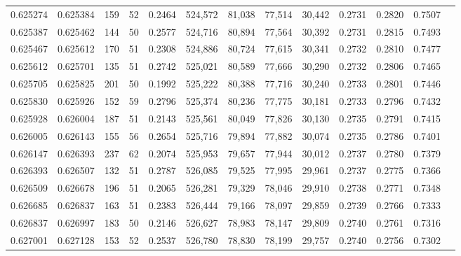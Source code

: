 \begin{tabular}{rrrrrrrrrrrrr}
0.625274 & 0.625384 &   159 &  52 &                                     0.2464 & 524,572 &  81,038 &  77,514 &  30,442 & 0.2731 & 0.2820 & 0.7507 \\
0.625387 & 0.625462 &   144 &  50 &                                     0.2577 & 524,716 &  80,894 &  77,564 &  30,392 & 0.2731 & 0.2815 & 0.7493 \\
0.625467 & 0.625612 &   170 &  51 &                                     0.2308 & 524,886 &  80,724 &  77,615 &  30,341 & 0.2732 & 0.2810 & 0.7477 \\
0.625612 & 0.625701 &   135 &  51 &                                     0.2742 & 525,021 &  80,589 &  77,666 &  30,290 & 0.2732 & 0.2806 & 0.7465 \\
0.625705 & 0.625825 &   201 &  50 &                                     0.1992 & 525,222 &  80,388 &  77,716 &  30,240 & 0.2733 & 0.2801 & 0.7446 \\
0.625830 & 0.625926 &   152 &  59 &                                     0.2796 & 525,374 &  80,236 &  77,775 &  30,181 & 0.2733 & 0.2796 & 0.7432 \\
0.625928 & 0.626004 &   187 &  51 &                                     0.2143 & 525,561 &  80,049 &  77,826 &  30,130 & 0.2735 & 0.2791 & 0.7415 \\
0.626005 & 0.626143 &   155 &  56 &                                     0.2654 & 525,716 &  79,894 &  77,882 &  30,074 & 0.2735 & 0.2786 & 0.7401 \\
0.626147 & 0.626393 &   237 &  62 &                                     0.2074 & 525,953 &  79,657 &  77,944 &  30,012 & 0.2737 & 0.2780 & 0.7379 \\
0.626393 & 0.626507 &   132 &  51 &                                     0.2787 & 526,085 &  79,525 &  77,995 &  29,961 & 0.2737 & 0.2775 & 0.7366 \\
0.626509 & 0.626678 &   196 &  51 &                                     0.2065 & 526,281 &  79,329 &  78,046 &  29,910 & 0.2738 & 0.2771 & 0.7348 \\
0.626685 & 0.626837 &   163 &  51 &                                     0.2383 & 526,444 &  79,166 &  78,097 &  29,859 & 0.2739 & 0.2766 & 0.7333 \\
0.626837 & 0.626997 &   183 &  50 &                                     0.2146 & 526,627 &  78,983 &  78,147 &  29,809 & 0.2740 & 0.2761 & 0.7316 \\
0.627001 & 0.627128 &   153 &  52 &                                     0.2537 & 526,780 &  78,830 &  78,199 &  29,757 & 0.2740 & 0.2756 & 0.7302 \\

\end{tabular}
